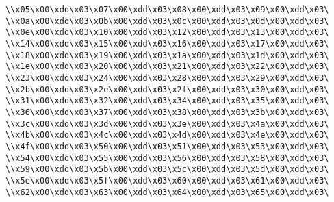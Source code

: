 \verb|\\x05\x00\xdd\x03\x07\x00\xdd\x03\x08\x00\xdd\x03\x09\x00\xdd\x03\|\newline
\verb|\\x0a\x00\xdd\x03\x0b\x00\xdd\x03\x0c\x00\xdd\x03\x0d\x00\xdd\x03\|\newline
\verb|\\x0e\x00\xdd\x03\x10\x00\xdd\x03\x12\x00\xdd\x03\x13\x00\xdd\x03\|\newline
\verb|\\x14\x00\xdd\x03\x15\x00\xdd\x03\x16\x00\xdd\x03\x17\x00\xdd\x03\|\newline
\verb|\\x18\x00\xdd\x03\x19\x00\xdd\x03\x1a\x00\xdd\x03\x1d\x00\xdd\x03\|\newline
\verb|\\x1e\x00\xdd\x03\x20\x00\xdd\x03\x21\x00\xdd\x03\x22\x00\xdd\x03\|\newline
\verb|\\x23\x00\xdd\x03\x24\x00\xdd\x03\x28\x00\xdd\x03\x29\x00\xdd\x03\|\newline
\verb|\\x2b\x00\xdd\x03\x2e\x00\xdd\x03\x2f\x00\xdd\x03\x30\x00\xdd\x03\|\newline
\verb|\\x31\x00\xdd\x03\x32\x00\xdd\x03\x34\x00\xdd\x03\x35\x00\xdd\x03\|\newline
\verb|\\x36\x00\xdd\x03\x37\x00\xdd\x03\x38\x00\xdd\x03\x3b\x00\xdd\x03\|\newline
\verb|\\x3c\x00\xdd\x03\x3d\x00\xdd\x03\x3e\x00\xdd\x03\x4a\x00\xdd\x03\|\newline
\verb|\\x4b\x00\xdd\x03\x4c\x00\xdd\x03\x4d\x00\xdd\x03\x4e\x00\xdd\x03\|\newline
\verb|\\x4f\x00\xdd\x03\x50\x00\xdd\x03\x51\x00\xdd\x03\x53\x00\xdd\x03\|\newline
\verb|\\x54\x00\xdd\x03\x55\x00\xdd\x03\x56\x00\xdd\x03\x58\x00\xdd\x03\|\newline
\verb|\\x59\x00\xdd\x03\x5b\x00\xdd\x03\x5c\x00\xdd\x03\x5d\x00\xdd\x03\|\newline
\verb|\\x5e\x00\xdd\x03\x5f\x00\xdd\x03\x60\x00\xdd\x03\x61\x00\xdd\x03\|\newline
\verb|\\x62\x00\xdd\x03\x63\x00\xdd\x03\x64\x00\xdd\x03\x65\x00\xdd\x03\|\newline
